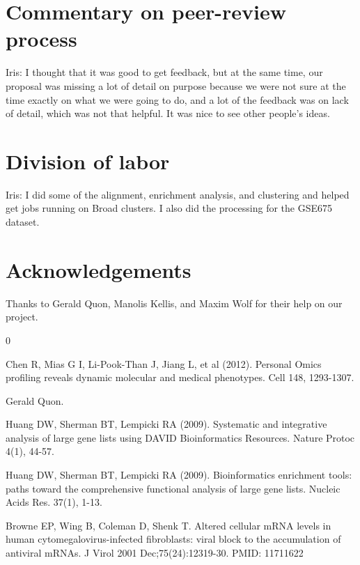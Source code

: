 \documentclass[aps,prd,final,onecolumn,a4paper,10pt]{revtex4}
\begin{document}
\section{Commentary on peer-review process}
Iris: I thought that it was good to get feedback, but at the same time, our proposal was missing a lot of detail on purpose because we were not sure at the time exactly on what we were going to do, and a lot of the feedback was on lack of detail, which was not that helpful. It was nice to see other people's ideas.

\section{Division of labor}

Iris: I did some of the alignment, enrichment analysis, and clustering and helped get jobs running on Broad clusters. I also did the processing for the GSE675 dataset.

\section{Acknowledgements}
Thanks to Gerald Quon, Manolis Kellis, and Maxim Wolf for their help on our project.

\begin{thebibliography} {0}

 Chen R, Mias G I, Li-Pook-Than J, Jiang L, et al (2012). Personal Omics profiling reveals dynamic molecular and medical phenotypes. Cell 148, 1293-1307.

 Gerald Quon.

 Huang DW, Sherman BT, Lempicki RA (2009). Systematic and integrative analysis of large gene lists using DAVID Bioinformatics Resources. Nature Protoc 4(1), 44-57.

 Huang DW, Sherman BT, Lempicki RA (2009). Bioinformatics enrichment tools: paths toward the comprehensive functional analysis of large gene lists. Nucleic Acids Res. 37(1), 1-13.

 Browne EP, Wing B, Coleman D, Shenk T. Altered cellular mRNA levels in human cytomegalovirus-infected fibroblasts: viral block to the accumulation of antiviral mRNAs. J Virol 2001 Dec;75(24):12319-30. PMID: 11711622


\end{thebibliography}
\end{document}
